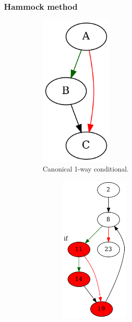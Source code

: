 \documentclass[aspectratio=1610]{beamer}
\begin{document}
\begin{frame}
	\frametitle{Hammock method}

	\begin{figure}[htbp]
		\centering
		\begin{subfigure}[b]{0.20\textwidth}
			\centering
			
			\includegraphics[width=0.4\textwidth]{inc/methods/hammock/if.png}
			\caption{Canonical 1-way conditional.}
		\end{subfigure}
		\quad
		\begin{subfigure}[b]{0.65\textwidth}
			\centering
			\begin{subfigure}[ht]{0.40\textwidth}
				\centering
				\includegraphics[width=0.5\textwidth]{inc/methods/hammock/main_0002a.png}

\end{subfigure}
\end{subfigure}
\end{figure}
\end{frame}
\end{document}
